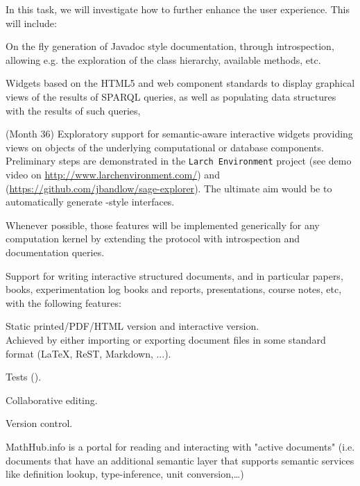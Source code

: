 \begin{workpackage}
\begin{tasklist}
\begin{task}[id=dynamic-inspect,title=Dynamic documentation and exploration system]
  In this task, we will investigate how to further enhance the user
  experience. This will include:
  \begin{compactitem}
  \item On the fly generation of Javadoc style documentation, through
    introspection, allowing e.g. the exploration of the class
    hierarchy, available methods, etc.
  \item Widgets based on the HTML5 and web component standards to display
    graphical views of the results of SPARQL queries, as well as populating data
    structures with the results of such queries,
  \item {} (Month 36)
    Exploratory support for semantic-aware interactive widgets
    providing views on objects of the underlying computational or
    database components. Preliminary steps are demonstrated in the
    \texttt{Larch Environment} project (see demo video on
    \url{http://www.larchenvironment.com/}) and
    (\url{https://github.com/jbandlow/sage-explorer}). The ultimate
    aim would be to automatically generate \LMFDB-style interfaces.
  \end{compactitem}
  Whenever possible, those features will be implemented generically
  for any computation kernel by extending the \Jupyter protocol with
  introspection and documentation queries.
\end{task}

\begin{task}[title=Structured documents,id=structdocs]
  Support for writing interactive structured documents, and in
  particular papers, books, experimentation log books and reports,
  presentations, course notes, etc, with the following features:
  \begin{compactitem}
  \item Static printed/PDF/HTML version and interactive version.\\
    Achieved by either importing or exporting document files in some
    standard format (LaTeX, ReST, Markdown, ...).
  \item Tests ().
  \item Collaborative editing.
  \item Version control.
  \end{compactitem}
  MathHub.info is a portal for reading and interacting with "active documents"
  (i.e. documents that have an additional semantic layer that supports semantic services
  like definition lookup, type-inference, unit conversion,\ldots)


\end{task}
\end{tasklist}
\end{workpackage}
